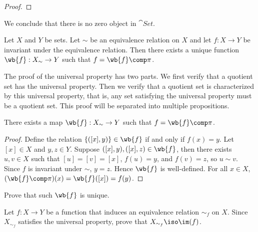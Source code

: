 \documentclass[10pt]{article}
\begin{document}
\begin{proof}
    
\end{proof}
\par
We conclude that there is no zero object in $\cat{Set}$.
\begin{Universal property for quotient sets}
    Let $X$ and $Y$ be sets. Let $\sim$ be an equivalence relation on $X$ and let $f:X\to Y$ be invariant under the equivalence relation. Then there exists a unique function $\wb{f}:{X}_{\sim}\to Y$ such that $f=\wb{f}\comp\pi$.
\end{Universal property for quotient sets}
\begin{center}
\end{center}
\par
The proof of the universal property has two parts. We first verify that a quotient set has the universal property. Then we verify that a quotient set is characterized by this universal property, that is, any set satisfying the universal property must be a quotient set. This proof will be separated into multiple propositions.
\begin{proposition}
    There exists a map $\wb{f}:{X}_{\sim}\to Y$ such that $f=\wb{f}\comp\pi$.
\end{proposition}
\begin{proof}
    Define the relation $\{([x],y)\}\in\wb{f}$ if and only if $f(x)=y$. Let $[x]\in X$ and $y,z\in Y$. Suppose $([x],y),([x],z)\in\wb{f}$, then there exists $u,v\in X$ such that $[u]=[v]=[x]$, $f(u)=y$, and $f(v)=z$, so $u\sim v$. Since $f$ is invariant under $\sim$, $y=z$. Hence $\wb{f}$ is well-defined. For all $x\in X$, $(\wb{f}\comp\pi)(x)=\wb{f}([x])=f(y)$.
\end{proof}
\begin{problem}
    Prove that such $\wb{f}$ is unique.
\end{problem}
\begin{problem}
    Let $f:X\to Y$ be a function that induces an equivalence relation ${\sim_{f}}$ on $X$. Since ${X}_{{\sim}_{f}}$ satisfies the universal property, prove that ${X}_{{\sim}_{f}}\iso\im(f)$.
\end{problem}
\end{document}
